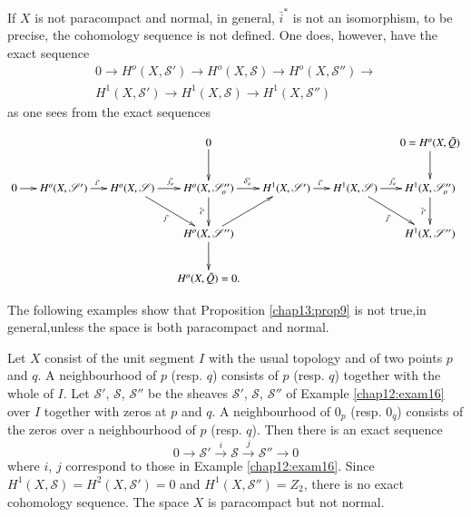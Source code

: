 \begin{note*}
If $X$  is not paracompact and normal, in general,
$\bar{i}^*$ is not an isomorphism, to be precise, the cohomology
sequence is not defined. One does, however, have the exact sequence  
\begin{multline*}
0 \to H^o(X, \mathscr{S}') \to H^o(X,\mathscr{S})\to
H^o(X,\mathscr{S}'')\to \\
H^1(X,\mathscr{S}')\to H^1(X,\mathscr{S})\to
H^1(X,\mathscr{S}'') 
\end{multline*}
as one sees from the exact sequences
\newpage

\begin{landscape}
\[
\xymatrix@C=0.5cm{
  & & & 0 \ar[d] & & & 0 = H^o(X,\bar{Q})\ar[d]\\
0 \ar[r] & H^o(X,\mathscr{S}') \ar[r]^{i^{\ast}} & H^o(X,\mathscr{S})
\ar[r]^{j^{\ast}_o}\ar[dr]_{j^{\ast}} & H^o(X,\mathscr{S}''_o)
\ar[r]^{\delta^{\ast}_o} \ar[d]_{\bar{i}^{\ast}} & H^1(X,\mathscr{S}')
\ar[r]^{i^{\ast}} & H^1(X,\mathscr{S}) \ar[r]^{j^{\ast}_o}
\ar[dr]_{j^{\ast}} & H^1(X,\mathscr{S}''_o)\ar[d]_{\bar{i}^{\ast}}\\
& & & H^o(X,\mathscr{S}'') \ar[ur]\ar[d] & & & H^1(X,\mathscr{S}'') \\
& & & H^o(X,\bar{Q}) = 0.
}
\]
\end{landscape}
 
\newpage

The following examples show that Proposition \ref{chap13:prop9} is not
true,\pageoriginale in general,unless the space is both paracompact
and normal.  
\end{note*}

\begin{exam}%
Let $X$ consist of the unit segment $I$ with the usual topology and of
two points $p$ and $q$. A neighbourhood of $p$ (resp. $q$) consists of
$p$ (resp. $q$) together with the whole of $I$. Let
$\mathscr{S}'$, $\mathscr{S}$, $\mathscr{S}''$ be the sheaves
$\mathscr{S}'$, $\mathscr{S}$, $\mathscr{S}''$ of Example
\ref{chap12:exam16} over $I$ 
together with zeros at $p$ and $q$. A neighbourhood of $0_p$
(resp. $0_q$) consists of the zeros over a neighbourhood of $p$
(resp. $q$). Then there is an exact  sequence  
$$
0 \to  \mathscr{S}' \xrightarrow{i} \mathscr{S} \xrightarrow{j}
\mathscr{S}'' \to 0 
$$ 
where $i$, $j$ correspond to those in Example
\ref{chap12:exam16}. Since $H^1(X, 
\mathscr{S})= H^2(X, \mathscr{S}')=0$ and $H^1(X, \mathscr{S}'')=Z_2$,
there is no exact cohomology sequence. The space $X$ is paracompact
but not normal.  
\end{exam}

